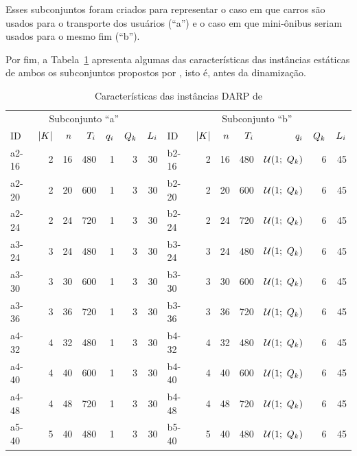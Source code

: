 Esses subconjuntos foram criados para representar o caso em que carros são
usados para o transporte dos usuários (``a'') e o caso em que mini-ônibus 
seriam usados para o mesmo fim (``b'').

Por fim, a Tabela~\ref{tab:ropke_models_2007_DARP_instances_caracteristics}
apresenta algumas das características das instâncias estáticas de ambos os 
subconjuntos propostos por \textcite{ropke_models_2007}, isto é, antes da
dinamização.


\begin{table}[h]
\footnotesize
  \centering
  \caption{Características das instâncias DARP de 
           \textcite{ropke_models_2007}}
  \newcommand{\qib}{$\uniformDistribution{1}{\vehicleCapacity}$}
  \label{tab:ropke_models_2007_DARP_instances_caracteristics}
  \begin{tabular}{lrrrrrr|lrrrrrr}
    \toprule
    \multicolumn{7}{c|}{Subconjunto ``a''} &
    \multicolumn{7}{c}{Subconjunto ``b''} \\
    ID & $|K|$ & $n$ & $T_i$ & 
    $q_i$ & $Q_k$ & $L_i$ & 
    ID & $|K|$ & $n$ & $T_i$ & 
    $q_i$ & $Q_k$ & $L_i$\\
    \midrule
    a2-16 & 2 & 16 & 480 & 1 & 3 & 30 & b2-16 & 2 & 16 & 480 & \qib & 6 & 45\\
    a2-20 & 2 & 20 & 600 & 1 & 3 & 30 & b2-20 & 2 & 20 & 600 & \qib & 6 & 45\\
    a2-24 & 2 & 24 & 720 & 1 & 3 & 30 & b2-24 & 2 & 24 & 720 & \qib & 6 & 45\\
    a3-24 & 3 & 24 & 480 & 1 & 3 & 30 & b3-24 & 3 & 24 & 480 & \qib & 6 & 45\\
    a3-30 & 3 & 30 & 600 & 1 & 3 & 30 & b3-30 & 3 & 30 & 600 & \qib & 6 & 45\\
    a3-36 & 3 & 36 & 720 & 1 & 3 & 30 & b3-36 & 3 & 36 & 720 & \qib & 6 & 45\\
    a4-32 & 4 & 32 & 480 & 1 & 3 & 30 & b4-32 & 4 & 32 & 480 & \qib & 6 & 45\\
    a4-40 & 4 & 40 & 600 & 1 & 3 & 30 & b4-40 & 4 & 40 & 600 & \qib & 6 & 45\\
    a4-48 & 4 & 48 & 720 & 1 & 3 & 30 & b4-48 & 4 & 48 & 720 & \qib & 6 & 45\\
    a5-40 & 5 & 40 & 480 & 1 & 3 & 30 & b5-40 & 5 & 40 & 480 & \qib & 6 & 45\\

\end{tabular}
\end{table}
